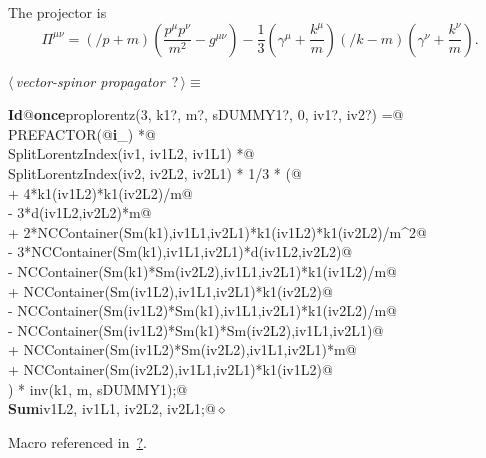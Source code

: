\documentclass[a4paper,12pt]{amsart}
\newcommand{\fmslash}[1]{\ensuremath{/\!\!\!{#1}}}
\renewcommand{\NWtarget}[2]{\hypertarget{#1}{#2}}
\renewcommand{\NWlink}[2]{\hyperlink{#1}{#2}}
\renewcommand{\NWtxtMacroRefIn}{Macro referenced in}
\renewcommand{\NWsep}{${\diamond}$}
\begin{document}
The projector is
\begin{equation}
\Pi^{\mu\nu}=\left(\fmslash{p}+m\right)
\left(\frac{p^\mu p^\nu}{m^2}-g^{\mu\nu}\right)-\frac13
\left(\gamma^\mu+\frac{k^\mu}{m}\right)
\left(\fmslash{k}-m\right)
\left(\gamma^\nu+\frac{k^\nu}{m}\right)\text{.}
\end{equation}
\begin{flushleft} \small
\begin{minipage}{\linewidth}\label{scrap31}\raggedright\small
\NWtarget{nuweb?}{} $\langle\,${\it vector-spinor propagator}\nobreak\ {\footnotesize {?}}$\,\rangle\equiv$
\vspace{-1ex}
\begin{list}{}{} \item
\mbox{}\verb@@\hbox{\sffamily\bfseries Id}\verb@ @\hbox{\sffamily\bfseries once}\verb@ proplorentz(3, k1?, m?, sDUMMY1?, 0, iv1?, iv2?) =@\\
\mbox{}\verb@   PREFACTOR(@\hbox{\sffamily\bfseries i}\verb@_) *@\\
\mbox{}\verb@   SplitLorentzIndex(iv1, iv1L2, iv1L1) *@\\
\mbox{}\verb@   SplitLorentzIndex(iv2, iv2L2, iv2L1) * 1/3 * (@\\
\mbox{}\verb@      + 4*k1(iv1L2)*k1(iv2L2)/m@\\
\mbox{}\verb@      - 3*d(iv1L2,iv2L2)*m@\\
\mbox{}\verb@      + 2*NCContainer(Sm(k1),iv1L1,iv2L1)*k1(iv1L2)*k1(iv2L2)/m^2@\\
\mbox{}\verb@      - 3*NCContainer(Sm(k1),iv1L1,iv2L1)*d(iv1L2,iv2L2)@\\
\mbox{}\verb@      - NCContainer(Sm(k1)*Sm(iv2L2),iv1L1,iv2L1)*k1(iv1L2)/m@\\
\mbox{}\verb@      + NCContainer(Sm(iv1L2),iv1L1,iv2L1)*k1(iv2L2)@\\
\mbox{}\verb@      - NCContainer(Sm(iv1L2)*Sm(k1),iv1L1,iv2L1)*k1(iv2L2)/m@\\
\mbox{}\verb@      - NCContainer(Sm(iv1L2)*Sm(k1)*Sm(iv2L2),iv1L1,iv2L1)@\\
\mbox{}\verb@      + NCContainer(Sm(iv1L2)*Sm(iv2L2),iv1L1,iv2L1)*m@\\
\mbox{}\verb@      + NCContainer(Sm(iv2L2),iv1L1,iv2L1)*k1(iv1L2)@\\
\mbox{}\verb@   ) * inv(k1, m, sDUMMY1);@\\
\mbox{}\verb@@\hbox{\sffamily\bfseries Sum}\verb@ iv1L2, iv1L1, iv2L2, iv2L1;@{\NWsep}
\end{list}
\vspace{-1.5ex}
\footnotesize
\begin{list}{}{\setlength{\itemsep}{-\parsep}\setlength{\itemindent}{-\leftmargin}}
\item \NWtxtMacroRefIn\ \NWlink{nuweb?}{?}.

\item{}
\end{list}
\end{minipage}\vspace{4ex}
\end{flushleft}
\end{document}

